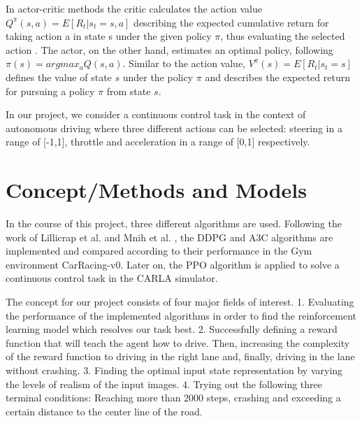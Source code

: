 \documentclass[letterpaper, 10 pt, conference]{ieeeconf}  %
\begin{document}
In actor-critic methods the critic calculates the action value $Q^\pi(s,a) = E[R_t|s_t=s,a]$ describing the expected cumulative return for taking action a in state s under the given policy $\pi$, thus evaluating the selected action \cite{lilianweng}. The actor, on the other hand, estimates an optimal policy, following $\pi(s) = argmax_aQ(s,a)$. Similar to the action value, $V^\pi(s) = E[R_t|s_t=s]$ defines the value of state $s$ under the policy $\pi$ and describes the expected return for pursuing a policy $\pi$ from state $s$.

In our project, we consider a continuous control task in the context of autonomous driving where three different actions can be selected: steering in a range of [-1,1], throttle  and acceleration in a range of [0,1] respectively.

\section{Concept/Methods and Models}

In the course of this project, three different algorithms are used. Following the work of Lillicrap et al. \cite{lillicrapContinuousControlDeep2015} and Mnih et al. \cite{mnihAsynchronousMethodsDeep2016}, the DDPG and A3C algorithms are implemented and compared according to their performance in the Gym environment CarRacing-v0. Later on, the PPO algorithm is applied to solve a continuous control task in the CARLA simulator.

The concept for our project consists of four major fields of interest. 1. Evaluating the performance of the implemented algorithms in order to find the reinforcement learning model which resolves our task best. 2. Successfully defining a reward function that will teach the agent how to drive. Then, increasing the complexity of the reward function to driving in the right lane and, finally, driving in the lane without crashing. 3. Finding the optimal input state representation by varying the levels of realism of the input images. 4. Trying out the following three terminal conditions: Reaching more than 2000 steps, crashing and exceeding a certain distance to the center line of the road.
\end{document}
